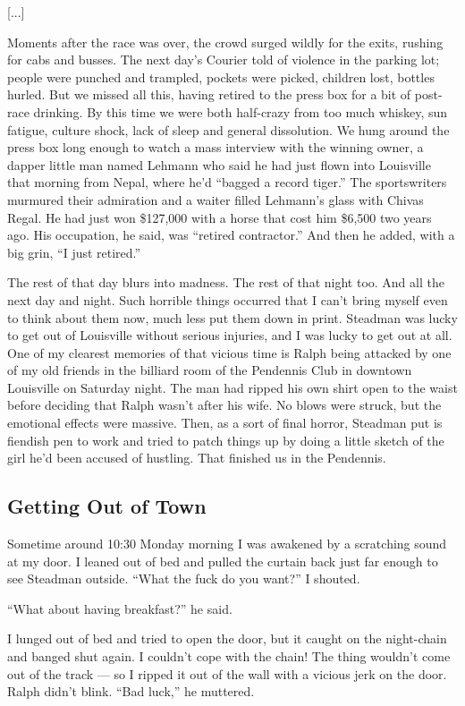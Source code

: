 \documentclass[9pt,a4paper]{extarticle}
\begin{document}
[...]

Moments after the race was over, the crowd surged wildly for the exits, rushing for cabs and busses. The next day’s Courier told of violence in the parking lot; people were punched and trampled, pockets were picked, children lost, bottles hurled. But we missed all this, having retired to the press box for a bit of post-race drinking. By this time we were both half-crazy from too much whiskey, sun fatigue, culture shock, lack of sleep and general dissolution. We hung around the press box long enough to watch a mass interview with the winning owner, a dapper little man named Lehmann who said he had just flown into Louisville that morning from Nepal, where he’d “bagged a record tiger.” The sportswriters murmured their admiration and a waiter filled Lehmann’s glass with Chivas Regal. He had just won \$127,000 with a horse that cost him \$6,500 two years ago. His occupation, he said, was “retired contractor.” And then he added, with a big grin, “I just retired.”

The rest of that day blurs into madness. The rest of that night too. And all the next day and night. Such horrible things occurred that I can’t bring myself even to think about them now, much less put them down in print. Steadman was lucky to get out of Louisville without serious injuries, and I was lucky to get out at all. One of my clearest memories of that vicious time is Ralph being attacked by one of my old friends in the billiard room of the Pendennis Club in downtown Louisville on Saturday night. The man had ripped his own shirt open to the waist before deciding that Ralph wasn’t after his wife. No blows were struck, but the emotional effects were massive. Then, as a sort of final horror, Steadman put is fiendish pen to work and tried to patch things up by doing a little sketch of the girl he’d been accused of hustling. That finished us in the Pendennis.

\subsection{Getting Out of Town}

Sometime around 10:30 Monday morning I was awakened by a scratching sound at my door. I leaned out of bed and pulled the curtain back just far enough to see Steadman outside. “What the fuck do you want?” I shouted.

“What about having breakfast?” he said.

I lunged out of bed and tried to open the door, but it caught on the night-chain and banged shut again. I couldn’t cope with the chain! The thing wouldn’t come out of the track — so I ripped it out of the wall with a vicious jerk on the door. Ralph didn’t blink. “Bad luck,” he muttered.
\end{document}
